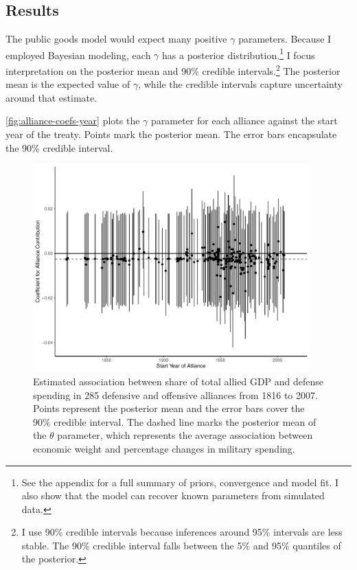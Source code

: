 \documentclass[12pt]{article}
\begin{document}
\subsection{Results} 


The public goods model would expect many positive $\gamma$ parameters. 
Because I employed Bayesian modeling, each $\gamma$ has a posterior distribution.\footnote{See the appendix for a full summary of priors, convergence and model fit. I also show that the model can recover known parameters from simulated data.} 
I focus interpretation on the posterior mean and 90\% credible intervals.\footnote{I use 90\% credible intervals because inferences around 95\% intervals are less stable. The 90\% credible interval falls between the 5\% and 95\% quantiles of the posterior.}
The posterior mean is the expected value of $\gamma$, while the credible intervals capture uncertainty around that estimate.  


\autoref{fig:alliance-coefs-year} plots the $\gamma$ parameter for each alliance against the start year of the treaty.
Points mark the posterior mean. 
The error bars encapsulate the 90\% credible interval.


\begin{figure}[htbp]
	\centering
		\includegraphics[width=0.95\textwidth]{alliance-coefs-year.pdf}
	\caption{Estimated association between share of total allied GDP and defense spending in 285 defensive and offensive alliances from 1816 to 2007. Points represent the posterior mean and the error bars cover the 90\% credible interval. The dashed line marks the posterior mean of the $\theta$ parameter, which represents the average association between economic weight and percentage changes in military spending.}
	\label{fig:alliance-coefs-year}
\end{figure}
\end{document}
